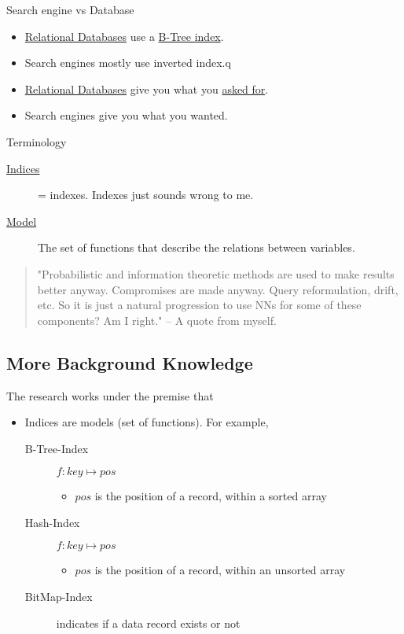 \documentclass[presentation]{beamer}
\begin{document}
\begin{frame}[label={sec:org70c951f}]{Search engine vs Database}
\begin{itemize}
\item \uline{Relational Databases} use a \uline{B-Tree index}.
\item \alert{Search engines} mostly use \alert{inverted index}.q
\item \uline{Relational Databases} give you what you \uline{asked for}.
\item \alert{Search engines} give you what you \alert{wanted}.
\end{itemize}
\end{frame}

\begin{frame}[label={sec:orgbd4bfb5}]{Terminology}
\begin{description}
\item[{\uline{Indices}}] = indexes. Indexes just sounds wrong to me.
\item[{\uline{Model}}] The \alert{set of functions} that describe the relations between variables.
\end{description}

\begin{quote}
"Probabilistic and information theoretic methods are used to make results better anyway.
Compromises are made anyway. Query reformulation, drift, etc.
So it is just a natural progression to use NNs for some of these components? Am I right." -- A quote from myself.
\end{quote}
\end{frame}

\subsection{More Background Knowledge}
\label{sec:orge98c11f}
\begin{frame}[label={sec:org2878a4e}]{The research works under the premise that}
\begin{itemize}
\item \alert{Indices are models} (set of functions). For example,
\begin{description}
\item[{B-Tree-Index}] \(f: key \mapsto pos\)
\begin{itemize}
\item \(pos\) is the position of a record, within a \alert{sorted} array
\end{itemize}
\item[{Hash-Index}] \(f: key \mapsto pos\)
\begin{itemize}
\item \(pos\) is the position of a record, within an \alert{unsorted} array
\end{itemize}
\item[{BitMap-Index}] indicates if a data record exists or not
\end{description}
\end{itemize}
\end{frame}
\end{document}
